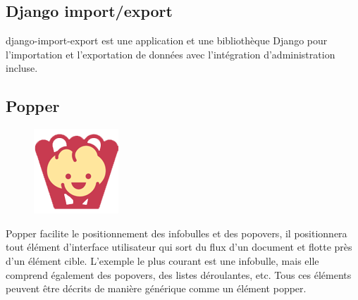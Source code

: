     \subsection{Django import/export}
        django-import-export est une application et une bibliothèque Django pour l'importation et l'exportation de données avec l'intégration d'administration incluse\cite{26}.
    
    \subsection{Popper}
            \begin{figure}
                \vspace{-22pt}
              \begin{center}
                 \includegraphics[scale=0.36]{images/logo/popper.png}
                 \label{fig81}
              \end{center}
              \vspace{-20pt}
              \vspace{-10pt}
            \end{figure}
        Popper facilite le positionnement des infobulles et des popovers, il positionnera tout élément d'interface utilisateur qui sort du flux d’un document et flotte près d'un élément cible. L'exemple le plus courant est une infobulle, mais elle comprend également des popovers, des listes déroulantes, etc. Tous ces éléments peuvent être décrits de manière générique comme un élément popper\cite{27}.
    
